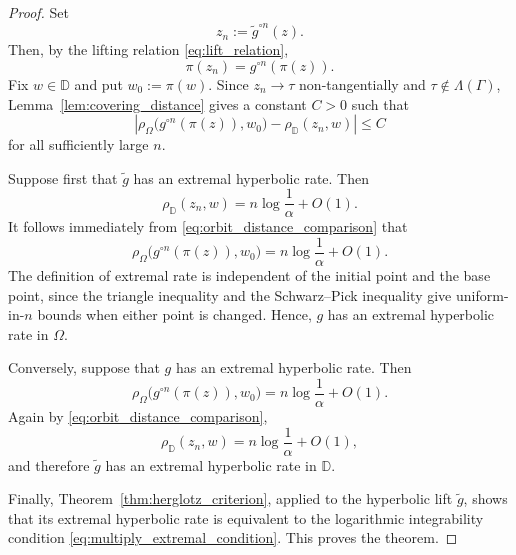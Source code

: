 \documentclass[12pt]{amsart}
\numberwithin{equation}{section}
\theoremstyle{plain}
\theoremstyle{definition}
\begin{document}
\begin{proof}
Set
\begin{equation*}
z_n:=\widetilde g^{\circ n}(z).
\end{equation*}
Then, by the lifting relation \eqref{eq:lift_relation},
\begin{equation*}
\pi(z_n)=g^{\circ n}(\pi(z)).
\end{equation*}
Fix $w\in\mathbb D$ and put $w_0:=\pi(w)$. Since
$z_n\to\tau$ non-tangentially and $\tau\notin\Lambda(\Gamma)$,
Lemma~\ref{lem:covering_distance} gives a constant $C>0$ such that
\begin{equation}
\label{eq:orbit_distance_comparison}
\left|
\rho_\Omega\bigl(g^{\circ n}(\pi(z)),w_0\bigr)
-
\rho_{\mathbb D}(z_n,w)
\right|
\le C
\end{equation}
for all sufficiently large $n$.

Suppose first that $\widetilde g$ has an extremal hyperbolic rate. Then
\begin{equation*}
\rho_{\mathbb D}(z_n,w)
=
n\log\frac1\alpha+O(1).
\end{equation*}
It follows immediately from \eqref{eq:orbit_distance_comparison} that
\begin{equation*}
\rho_\Omega\bigl(g^{\circ n}(\pi(z)),w_0\bigr)
=
n\log\frac1\alpha+O(1).
\end{equation*}
The definition of extremal rate is independent of the initial point and
the base point, since the triangle inequality and the Schwarz--Pick
inequality give uniform-in-$n$ bounds when either point is changed.
Hence, $g$ has an extremal hyperbolic rate in $\Omega$.

Conversely, suppose that $g$ has an extremal hyperbolic rate. Then
\begin{equation*}
\rho_\Omega\bigl(g^{\circ n}(\pi(z)),w_0\bigr)
=
n\log\frac1\alpha+O(1).
\end{equation*}
Again by \eqref{eq:orbit_distance_comparison},
\begin{equation*}
\rho_{\mathbb D}(z_n,w)
=
n\log\frac1\alpha+O(1),
\end{equation*}
and therefore $\widetilde g$ has an extremal hyperbolic rate in
$\mathbb D$.

Finally, Theorem~\ref{thm:herglotz_criterion}, applied to the hyperbolic
lift $\widetilde g$, shows that its extremal hyperbolic rate is equivalent
to the logarithmic integrability condition
\eqref{eq:multiply_extremal_condition}. This proves the theorem.
\end{proof}
\end{document}
